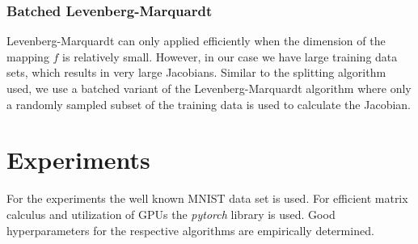 \documentclass[english,11pt,a4paper]{article}
\begin{document}
\subsubsection{Batched Levenberg-Marquardt}

Levenberg-Marquardt can only applied efficiently when the dimension of the mapping $f$ is relatively small. However, in our case we have large training data sets, which results in very large Jacobians. Similar to the splitting algorithm used, we use a batched variant of the Levenberg-Marquardt algorithm where only a randomly sampled subset of the training data is used to calculate the Jacobian.

\section{Experiments}

For the experiments the well known MNIST data set is used. For efficient matrix calculus and utilization of GPUs the \textit{pytorch} library is used. Good hyperparameters for the respective algorithms are empirically determined.


\pagebreak

\printbibliography
\end{document}
